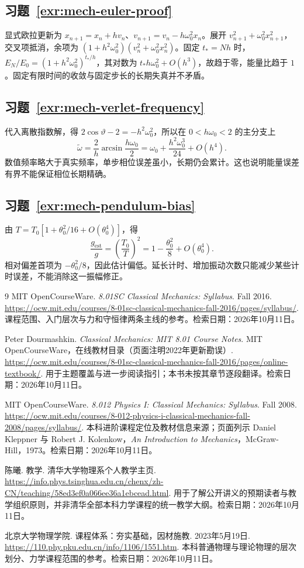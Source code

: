 \documentclass[UTF8,12pt,a4paper,fontset=fandol]{ctexbook}
\begin{document}
\subsection*{习题~\ref{exr:mech-euler-proof}}
显式欧拉更新为 $x_{n+1}=x_n+hv_n$、$v_{n+1}=v_n-h\omega_0^2x_n$。展开 $v_{n+1}^2+\omega_0^2x_{n+1}^2$，交叉项抵消，余项为 $(1+h^2\omega_0^2)(v_n^2+\omega_0^2x_n^2)$。固定 $t_*=Nh$ 时，$E_N/E_0=(1+h^2\omega_0^2)^{t_*/h}$，其对数为 $t_*h\omega_0^2+O(h^3)$，故趋于零，能量比趋于 $1$。固定有限时间的收敛与固定步长的长期失真并不矛盾。

\subsection*{习题~\ref{exr:mech-verlet-frequency}}
代入离散指数解，得 $2\cos\vartheta-2=-h^2\omega_0^2$，所以在 $0<h\omega_0<2$ 的主分支上
\[
 \widetilde\omega=\frac2h\arcsin\frac{h\omega_0}2
 =\omega_0+\frac{h^2\omega_0^3}{24}+O(h^4).
\]
数值频率略大于真实频率，单步相位误差虽小，长期仍会累计。这也说明能量误差有界不能保证相位长期精确。

\subsection*{习题~\ref{exr:mech-pendulum-bias}}
由 $T=T_0[1+\theta_0^2/16+O(\theta_0^4)]$，得
\[
 \frac{g_{\mathrm{est}}}{g}=\left(\frac{T_0}{T}\right)^2
 =1-\frac{\theta_0^2}{8}+O(\theta_0^4).
\]
相对偏差首项为 $-\theta_0^2/8$，因此估计偏低。延长计时、增加振动次数只能减少某些计时误差，不能消除这一振幅修正。

\backmatter
\begin{thebibliography}{9}
MIT OpenCourseWare. \textit{8.01SC Classical Mechanics: Syllabus}. Fall 2016.
\url{https://ocw.mit.edu/courses/8-01sc-classical-mechanics-fall-2016/pages/syllabus/}.
课程范围、入门层次与力和守恒律两条主线的参考。检索日期：2026年10月11日。

Peter Dourmashkin. \textit{Classical Mechanics: MIT 8.01 Course Notes}. MIT OpenCourseWare，在线教材目录（页面注明2022年更新勘误）.
\url{https://ocw.mit.edu/courses/8-01sc-classical-mechanics-fall-2016/pages/online-textbook/}.
用于主题覆盖与进一步阅读指引；本书未按其章节逐段翻译。检索日期：2026年10月11日。

MIT OpenCourseWare. \textit{8.012 Physics I: Classical Mechanics: Syllabus}. Fall 2008.
\url{https://ocw.mit.edu/courses/8-012-physics-i-classical-mechanics-fall-2008/pages/syllabus/}.
本科进阶课程定位及教材信息来源；页面列示 Daniel Kleppner 与 Robert J. Kolenkow，\textit{An Introduction to Mechanics}，McGraw-Hill，1973。检索日期：2026年10月11日。

陈曦. 教学. 清华大学物理系个人教学主页.
\url{https://info.phys.tsinghua.edu.cn/chenx/zh-CN/teaching/58ed3ef0a066ee36a1ebcead.html}.
用于了解公开讲义的预期读者与教学组织原则，并非清华全部本科力学课程的统一教学大纲。检索日期：2026年10月11日。

北京大学物理学院. 课程体系：夯实基础，因材施教. 2023年5月19日.
\url{https://110.phy.pku.edu.cn/info/1106/1551.htm}.
本科普通物理与理论物理的层次划分、力学课程范围的参考。检索日期：2026年10月11日。
\end{thebibliography}
\end{document}
